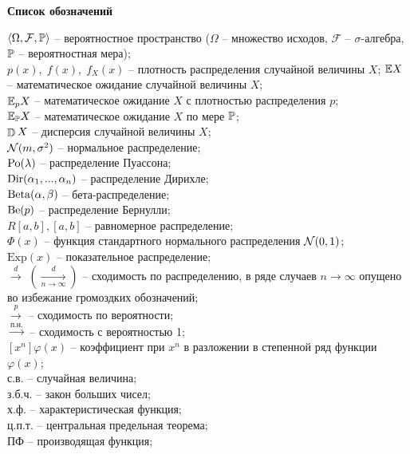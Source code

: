 \begin{center}
\textbf{
Список обозначений
}
\end{center}

\noindent $\langle \Omega, \mathcal{F}, \mathrm{{\mathbb P}} \rangle$ -- вероятностное пространство ($\Omega$ -- множество исходов, $\mathcal{F}$ -- $\sigma$-алгебра, $\mathrm{{\mathbb P}}$ -- вероятностная мера); \\
$p(x), \; f(x), \; f_X(x)$ -- плотность распределения случайной величины $X$;
$\mathrm{{\mathbb E}} X$ -- математическое ожидание случайной величины $X$; \\
$\mathrm{{\mathbb E}}_p X$ -- математическое ожидание $X$ с плотностью распределения $p$; \\
$\mathrm{{\mathbb E}}_{\mathrm{{\mathbb P}}} X$ -- математическое ожидание $X$ по мере $\mathrm{{\mathbb P}}$; \\
$\mathop{\mathbb{D}}\nolimits X$ -- дисперсия случайной величины $X$; \\
$\mathcal{N}(m,\sigma^2)$ -- нормальное распределение; \\
$\mathrm{Po}(\lambda)$ -- распределение Пуассона; \\
$\mathrm{Dir}(\alpha_1,...,\alpha_n)$ -- распределение Дирихле;\\
$\mathrm{Beta}(\alpha,\beta)$ -- бета-распределение;\\
$\mathrm{Be}(p)$ -- распределение Бернулли; \\
$R[a,b], [a,b]$ -- равномерное распределение; \\
$\Phi(x)$ -- функция стандартного нормального распределения $\mathcal{N}(0,1)$; \\
$\mathrm{Exp}(x)$ -- показательное распределение; \\
$\overset{d}{\longrightarrow}$ $\left(\mathop{\longrightarrow}\limits_{n\to\infty}^{d}\right)$ -- сходимость по распределению, в ряде случаев $n\to\infty$ опущено во избежание громоздких обозначений; \\
$\overset{p}{\longrightarrow}$ -- сходимость по вероятности; \\
$\overset{\text{п.н.}}{\longrightarrow}$ -- сходимость с вероятностью 1;\\
$[x^{n}]\varphi(x)$ -- коэффициент при $x^n$ в разложении в степенной ряд функции $\varphi(x)$;\\
с.в. -- случайная величина; \\
з.б.ч. -- закон больших чисел; \\
х.ф. -- характеристическая функция; \\
ц.п.т. -- центральная предельная теорема; \\
ПФ -- производящая функция; \\
